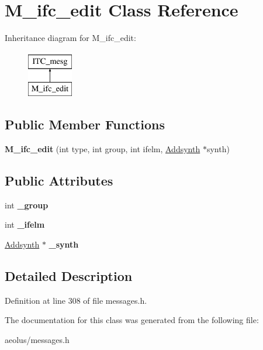 \hypertarget{class_m__ifc__edit}{}\section{M\+\_\+ifc\+\_\+edit Class Reference}
\label{class_m__ifc__edit}
Inheritance diagram for M\+\_\+ifc\+\_\+edit\+:\begin{figure}[H]
\begin{center}
\leavevmode
\includegraphics[height=2.000000cm]{class_m__ifc__edit}
\end{center}
\end{figure}
\subsection*{Public Member Functions}
\begin{DoxyCompactItemize}
\item 
\mbox{\label{class_m__ifc__edit_a8c4625e8d6cb8036fffe7bb57263e33e}} 
{\bfseries M\+\_\+ifc\+\_\+edit} (int type, int group, int ifelm, \hyperlink{class_addsynth}{Addsynth} $\ast$synth)
\end{DoxyCompactItemize}
\subsection*{Public Attributes}
\begin{DoxyCompactItemize}
\item 
\mbox{\label{class_m__ifc__edit_a3054a0815dee9dc742c44e00aa26ddc2}} 
int {\bfseries \+\_\+group}
\item 
\mbox{\label{class_m__ifc__edit_add758b602443535744f4ae457ad7db59}} 
int {\bfseries \+\_\+ifelm}
\item 
\mbox{\label{class_m__ifc__edit_ac4ae10bec0b5b22d8bcca82651e4b9dd}} 
\hyperlink{class_addsynth}{Addsynth} $\ast$ {\bfseries \+\_\+synth}
\end{DoxyCompactItemize}


\subsection{Detailed Description}


Definition at line 308 of file messages.\+h.



The documentation for this class was generated from the following file\+:\begin{DoxyCompactItemize}
\item 
aeolus/messages.\+h\end{DoxyCompactItemize}
